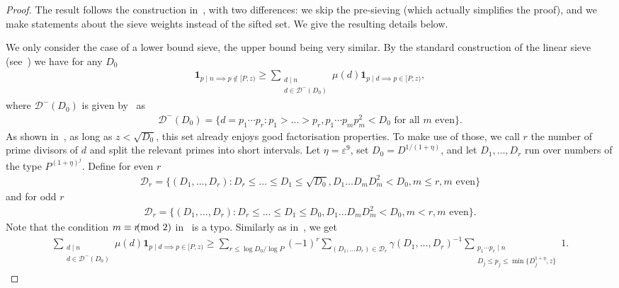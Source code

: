 \documentclass[12pt]{amsart}
\theoremstyle{definition}
\theoremstyle{remark}
\numberwithin{equation}{section}
\newcommand{\1}{\mathbf{1}}
\let\oldpmod\pmod
\renewcommand{\pmod}[1]{\hspace{-0.12cm}\oldpmod {#1}}
\begin{document}
\begin{proof}
    The result follows the construction in~\cite[Section 12.7]{cribro}, with two differences: we skip the pre-sieving (which actually simplifies the proof), and we make statements about the sieve weights instead of the sifted set. We give the resulting details below.

    We only consider the case of a lower bound sieve, the upper bound being very similar. By the standard construction of the linear sieve (see~\cite[eq. (12.10)]{cribro}) we have for any $D_0$
    \begin{align*}
        \1_{p\mid n \implies p\not \in [P,z)}\geq \sum_{\substack{d\mid n\\ d\in \mathcal{D}^-(D_0)}}\mu(d)\1_{p\mid d \implies p \in [P,z)},
    \end{align*}
    where $\mathcal{D}^{-}(D_0)$ is given by~\cite[eq. (12.32)]{cribro} as
    \begin{align*}
    \mathcal{D}^{-}(D_0)=\{d=p_1\cdots p_r : p_1>\ldots > p_r, p_1\cdots p_m p_m^2 <D_0 \text{ for all } m \text{ even}\}.
    \end{align*}
    As shown in~\cite[Corollary 12.17]{cribro}, as long as $z<\sqrt{D_0}$, this set already enjoys good factorisation properties. To make use of those, we call $r$ the number of prime divisors of $d$ and split the relevant primes into short intervals. Let $\eta=\varepsilon^9$, set $D_0=D^{1/(1+\eta)}$, and let $D_1, \ldots, D_r$ run over numbers of the type $P^{(1+\eta)^j}$. Define for even $r$
    \begin{align*}
        \mathcal{D}_r=\{(D_1,\ldots,D_r)\colon D_r\leq \ldots \leq D_1 \leq \sqrt{D_0},
        D_1\ldots D_m D_m^{2}<D_0, m\leq r, m \text{ even}\} 
    \end{align*}
    and for odd $r$
    \begin{align*}
        \mathcal{D}_r=\{(D_1,\ldots,D_r)\colon D_r\leq \ldots \leq D_1 \leq D_0,
        D_1\ldots D_m D_m^{2}<D_0, m< r, m \text{ even}\}.
    \end{align*}
    Note that the condition $m\equiv r \pmod 2$ in~\cite[eq. (12.84), (12.85)]{cribro} is a typo. Similarly as in~\cite[eq. (12.86)]{cribro}, we get
    \begin{align}\label{eq:wellfacto1}
        \sum_{\substack{d\mid n\\ d\in \mathcal{D}^-(D_0)}}\mu(d)\1_{p\mid d \implies p \in [P,z)}\geq \sum_{r\leq \log D_0/ \log P} (-1)^r \sum_{(D_1,\ldots D_r)\in \mathcal{D}_r} \gamma(D_1,\ldots ,D_r)^{-1} \sum_{\substack{p_1 \cdots p_r\mid n\\ D_j\leq p_j \leq \min\{D_j^{1+\eta},z\}}}1.

\end{align}
\end{proof}
\end{document}
